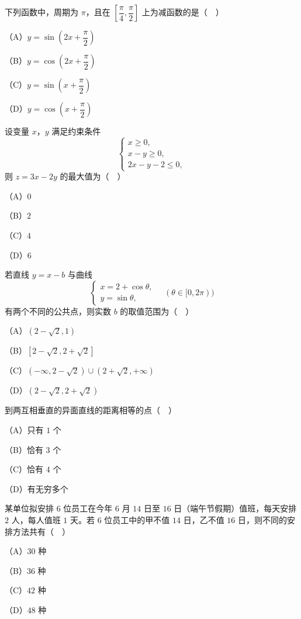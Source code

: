 \begin{question}
下列函数中，周期为 $\pi$，且在 $\left[\dfrac{\pi}{4},\dfrac{\pi}{2}\right]$ 上为减函数的是（　）

（A）$y=\sin\left(2x+\dfrac{\pi}{2}\right)$

（B）$y=\cos\left(2x+\dfrac{\pi}{2}\right)$

（C）$y=\sin\left(x+\dfrac{\pi}{2}\right)$

（D）$y=\cos\left(x+\dfrac{\pi}{2}\right)$

\end{question}
\begin{question}
设变量 $x$，$y$ 满足约束条件
\nopagebreak[4]
\[\begin{cases}x\geqslant 0,\\x-y\geqslant 0,\\2x-y-2\leqslant 0,\end{cases}\]
则 $z=3x-2y$ 的最大值为（　）

（A）$0$

（B）$2$

（C）$4$

（D）$6$

\end{question}
\begin{question}
若直线 $y=x-b$ 与曲线
\nopagebreak[4]
\[\begin{cases}x=2+\cos\theta,\\y=\sin\theta,\end{cases}\quad(\theta\in[0,2\pi))\]
有两个不同的公共点，则实数 $b$ 的取值范围为（　）

（A）$(2-\sqrt2,1)$

（B）$[2-\sqrt2,2+\sqrt2]$

（C）$(-\infty,2-\sqrt2)\cup(2+\sqrt2,+\infty)$

（D）$(2-\sqrt2,2+\sqrt2)$

\end{question}
\begin{question}
到两互相垂直的异面直线的距离相等的点（　）

（A）只有 $1$ 个

（B）恰有 $3$ 个

（C）恰有 $4$ 个

（D）有无穷多个

\end{question}
\begin{question}
某单位拟安排 $6$ 位员工在今年 $6$ 月 $14$ 日至 $16$ 日（端午节假期）值班，每天安排 $2$ 人，每人值班 $1$ 天。若 $6$ 位员工中的甲不值 $14$ 日，乙不值 $16$ 日，则不同的安排方法共有（　）

（A）$30$ 种

（B）$36$ 种

（C）$42$ 种

（D）$48$ 种

\end{question}
